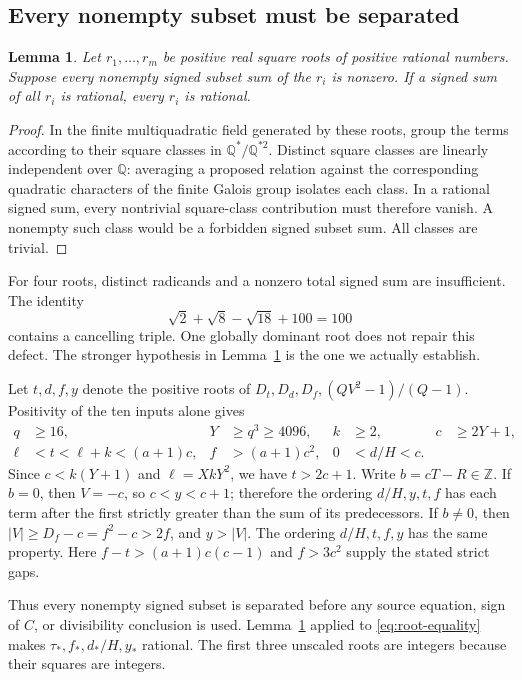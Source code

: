 \documentclass[11pt]{article}
\newtheorem{lemma}[theorem]{Lemma}
\theoremstyle{remark}
\newcommand{\Z}{\mathbb Z}
\newcommand{\Q}{\mathbb Q}
\begin{document}
\subsection{Every nonempty subset must be separated}
\begin{lemma}\label{lem:rational}
Let $r_1,\ldots,r_m$ be positive real square roots of positive rational
numbers. Suppose every nonempty signed subset sum of the $r_i$ is
nonzero. If a signed sum of all $r_i$ is rational, every $r_i$ is rational.
\end{lemma}
\begin{proof}
In the finite multiquadratic field generated by these roots, group the
terms according to their square classes in $\Q^*/\Q^{*2}$. Distinct
square classes are linearly independent over $\Q$: averaging a proposed
relation against the corresponding quadratic characters of the finite
Galois group isolates each class. In a rational signed sum, every
nontrivial square-class contribution must therefore vanish. A nonempty
such class would be a forbidden signed subset sum. All classes are trivial.
\end{proof}

For four roots, distinct radicands and a nonzero total signed sum are
insufficient. The identity
\[
 \sqrt2+\sqrt8-\sqrt{18}+100=100
\]
contains a cancelling triple. One globally dominant root does not repair
this defect. The stronger hypothesis in Lemma~\ref{lem:rational} is the
one we actually establish.

Let $t,d,f,y$ denote the positive roots of $D_t,D_d,D_f,(QV^2-1)/(Q-1)$.
Positivity of the ten inputs alone gives
\begin{align*}
 q&\ge16,&Y&\ge q^3\ge4096,&k&\ge2,&c&\ge2Y+1,\\
 \ell&<t<\ell+k<(a+1)c,&f&>(a+1)c^2,&0&<d/H<c.
\end{align*}
Since $c<k(Y+1)$ and $\ell=XkY^2$, we have $t>2c+1$.
Write $b=cT-R\in\Z$. If $b=0$, then $V=-c$, so
$c<y<c+1$; therefore the ordering $d/H,y,t,f$ has each term after the
first strictly greater than the sum of its predecessors. If $b\ne0$,
then $|V|\ge D_f-c=f^2-c>2f$, and $y>|V|$. The ordering
$d/H,t,f,y$ has the same property. Here $f-t>(a+1)c(c-1)$ and
$f>3c^2$ supply the stated strict gaps.

Thus every nonempty signed subset is separated before any source
equation, sign of $C$, or divisibility conclusion is used.
Lemma~\ref{lem:rational} applied to \eqref{eq:root-equality} makes
$\tau_*,f_*,d_*/H,y_*$ rational. The first three unscaled roots are
integers because their squares are integers.
\end{document}
